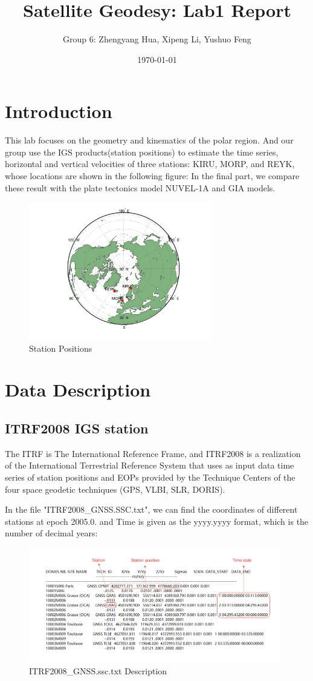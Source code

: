 \documentclass{article}
\title{Satellite Geodesy: Lab1 Report}
\author{Group 6: Zhengyang Hua, Xipeng Li, Yushuo Feng}
\date{\today}
\begin{document}
\maketitle
\tableofcontents

\section{Introduction}
This lab focuses on the geometry and kinematics of the polar region. 
And our group use the IGS products(station positions) to estimate the time series, horizontal and vertical velocities of three stations: KIRU, MORP, and REYK, whose locations are shown in the following figure:
In the final part, we compare these result with the plate tectonics model NUVEL-1A and GIA models.
\begin{figure}[htbp]
  \centering
  \includegraphics[width=8cm]{../result/point/Point.jpg}
  \captionsetup{skip=0.2cm}
  \caption{Station Positions}
  \label{Intro:station}
\end{figure}

\section{Data Description}
\subsection{ITRF2008 IGS station}
The ITRF is The International Reference Frame,  
and ITRF2008 is a realization of the International Terrestrial Reference System 
that uses as input data time series of station positions and EOPs provided by the Technique Centers of the four space geodetic techniques (GPS, VLBI, SLR, DORIS).

In the file "ITRF2008\_GNSS.SSC.txt", we can find the coordinates of different stations at epoch 2005.0.
 and Time is given as the yyyy.yyyy format, which is the number of decimal years:
\begin{figure}[htbp]
    \centering
    \includegraphics[width=11cm]{./source/ITRF2008.png}
    \caption{ITRF2008\_GNSS.ssc.txt Description}
    \label{fig:ITRF2008}
\end{figure}
\end{document}
